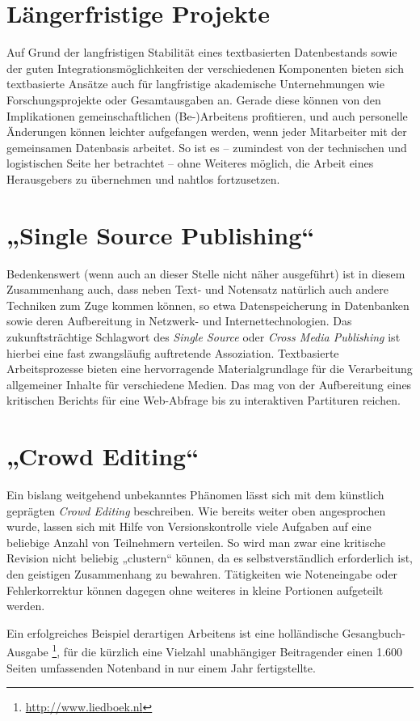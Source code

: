 \documentclass[DIV=12]{scrreprt}
\begin{document}
\section{Längerfristige Projekte}
\label{sec:pt_longrunning-projects}
Auf Grund der langfristigen Stabilität eines textbasierten Datenbestands sowie der guten Integrationsmöglichkeiten der verschiedenen Komponenten bieten sich textbasierte Ansätze auch für langfristige akademische Unternehmungen wie Forschungsprojekte oder Gesamtausgaben an.
Gerade diese können von den Implikationen gemeinschaftlichen (Be-)Arbeitens profitieren, und auch personelle Änderungen können leichter aufgefangen werden, wenn jeder Mitarbeiter mit der gemeinsamen Datenbasis arbeitet.
So ist es -- zumindest von der technischen und logistischen Seite her betrachtet -- ohne Weiteres möglich, die Arbeit eines Herausgebers zu übernehmen und nahtlos fortzusetzen.


\section{„Single Source Publishing“}
\label{sec:pt_single-source-publishing}
Bedenkenswert (wenn auch an dieser Stelle nicht näher ausgeführt) ist in diesem Zusammenhang auch, dass neben Text- und Notensatz natürlich auch andere Techniken zum Zuge kommen können, so etwa Datenspeicherung in Datenbanken sowie deren Aufbereitung in Netzwerk- und Internettechnologien.
Das zukunftsträchtige Schlagwort des \emph{Single Source} oder \emph{Cross Media Publishing} ist hierbei eine fast zwangsläufig auftretende Assoziation.
Textbasierte Arbeitsprozesse bieten eine hervorragende Materialgrundlage für die Verarbeitung allgemeiner Inhalte für verschiedene Medien.
Das mag von der Aufbereitung eines kritischen Berichts für eine Web-Abfrage bis zu interaktiven Partituren reichen.

\section{„Crowd Editing“}
\label{sec:pt_crowd-editing}
Ein bislang weitgehend unbekanntes Phänomen lässt sich mit dem künstlich geprägten \emph{Crowd Editing} beschreiben.
Wie bereits weiter oben angesprochen wurde, lassen sich mit Hilfe von Versionskontrolle viele Aufgaben auf eine beliebige Anzahl von Teilnehmern verteilen.
So wird man zwar eine kritische Revision nicht beliebig „clustern“ können, da es selbstverständlich erforderlich ist, den geistigen Zusammenhang zu bewahren.
Tätigkeiten wie Noteneingabe oder Fehlerkorrektur können dagegen ohne weiteres in kleine Portionen aufgeteilt werden.

Ein erfolgreiches Beispiel derartigen Arbeitens ist eine holländische Gesangbuch-Ausgabe%
\footnote{\url{http://www.liedboek.nl}},
für die kürzlich eine Vielzahl unabhängiger Beitragender einen 1.600 Seiten umfassenden Notenband in nur einem Jahr fertigstellte.
\end{document}
